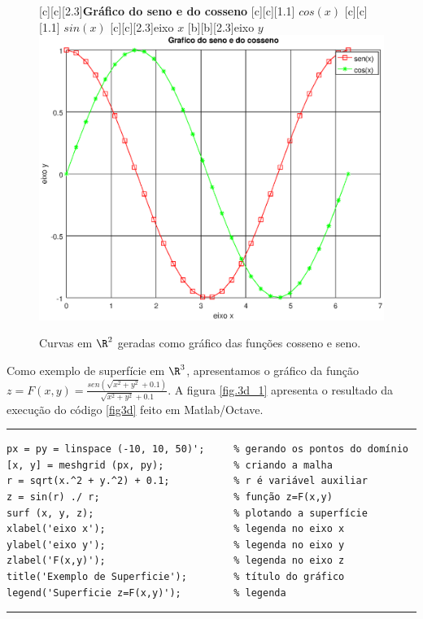 \begin{figure}[htpb]
\begin{center} 
[c][c][2.3]{\textbf{Gráfico do seno e do cosseno}}
[c][c][1.1]{\hspace{-0.1cm} $cos(x)$}
[c][c][1.1]{\hspace{-0.1cm} $sin(x)$}
[c][c][2.3]{eixo $x$}
[b][b][2.3]{eixo $y$}
\includegraphics*[angle=0,scale=0.5]{imagens/cap2/CosSin.eps} 
\vspace{-0.5cm}
\caption{Curvas em $\R^2$ geradas como gráfico das funções cosseno e seno.} 
\label{fig.CosSin}
\end{center}
\end{figure}

 Como exemplo de superfície em $\R^3$, apresentamos o gráfico da função $z=F(x,y)=\frac{sen(\sqrt{x^2+y^2}+0.1)}{\sqrt{x^2+y^2}+0.1}$. A figura \ref{fig.3d_1} apresenta o resultado da execução do código \ref{fig3d} feito em Matlab/Octave.

\begin{Codigo}[htpb]
\noindent\rule{13cm}{1.pt}
\begin{verbatim}
px = py = linspace (-10, 10, 50)';     % gerando os pontos do domínio
[x, y] = meshgrid (px, py);            % criando a malha 
r = sqrt(x.^2 + y.^2) + 0.1;           % r é variável auxiliar
z = sin(r) ./ r;                       % função z=F(x,y) 
surf (x, y, z);                        % plotando a superfície
xlabel('eixo x');                      % legenda no eixo x
ylabel('eixo y');                      % legenda no eixo y
zlabel('F(x,y)');                      % legenda no eixo z
title('Exemplo de Superficie');        % título do gráfico 
legend('Superficie z=F(x,y)');         % legenda
\end{verbatim}
\vspace{-0.5cm}
\caption{Código utilizado para gerar a figura \ref{fig.3d_1} } 
\noindent\rule{13cm}{1.pt}
\label{fig3d}
\end{Codigo}

